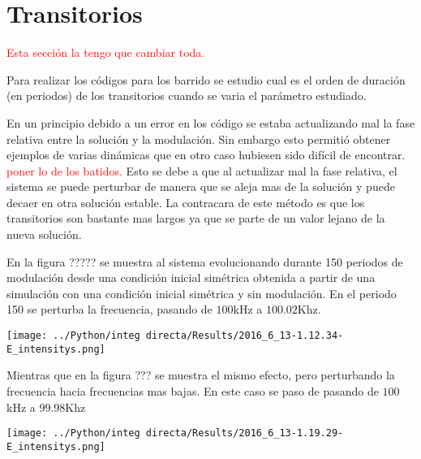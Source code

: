 \section{Transitorios}
	\textcolor{red}{Esta sección la tengo que cambiar toda.}
	
	Para realizar los códigos para los barrido se estudio cual es el orden de duración (en periodos) de los transitorios cuando se varia el parámetro estudiado.
	
	En un principio debido a un error en los código se estaba actualizando mal la fase relativa entre la solución y la modulación. 
	Sin embargo esto permitió obtener ejemplos de varias dinámicas que en otro caso hubiesen sido difícil de encontrar. 
	\textcolor{red}{poner lo de los batidos.}
	Esto se debe a que  al actualizar mal la fase relativa, el sistema se puede perturbar de manera que se aleja mas de la solución y puede decaer en otra solución estable. 
	La contracara de este método es que los transitorios son bastante mas largos ya que se parte de un valor lejano de la nueva solución.
	
	
	En la figura ????? se muestra al sistema evolucionando durante 150 periodos de modulación desde una condición inicial simétrica obtenida a partir de una simulación con una condición inicial simétrica y sin modulación. En el periodo 150 se perturba la frecuencia, pasando de $100$kHz a $100.02$Khz.
	
	\begin{center}
		\texttt{[image: ../Python/integ directa/Results/2016\_6\_13-1.12.34-E\_intensitys.png]}
	\end{center}
	
	Mientras que en la figura ??? se muestra el mismo efecto, pero perturbando la frecuencia hacia frecuencias mas bajas. 
	En este caso se paso de  pasando de $100$kHz a $99.98$Khz
	
	
	\begin{center}
		\texttt{[image: ../Python/integ directa/Results/2016\_6\_13-1.19.29-E\_intensitys.png]}
	\end{center}
	
%	
%	

